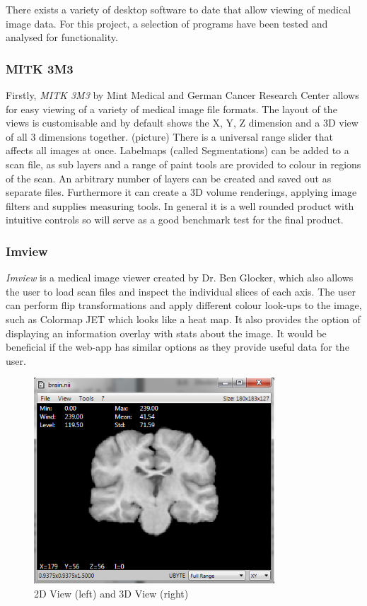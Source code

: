 \documentclass[a4paper,11pt,titlepage]{article}
\begin{document}
There exists a variety of desktop software to date that allow viewing of medical image data. For this project, a selection of programs have been tested and analysed for functionality.

\subsubsection{MITK 3M3}
Firstly, \textit{MITK 3M3} by Mint Medical and German Cancer Research Center allows for easy viewing of a variety of medical image file formats. The layout of the views is customisable and by default shows the X, Y, Z dimension and a 3D view of all 3 dimensions together. (picture) There is a universal range slider that affects all images at once. Labelmaps (called Segmentations) can be added to a scan file, as sub layers and a range of paint tools are provided to colour in regions of the scan. An arbitrary number of layers can be created and saved out as separate files. 
Furthermore it can create a 3D volume renderings, applying image filters and supplies measuring tools. In general it is a well rounded product with intuitive controls so will serve as a good benchmark test for the final product.

\subsubsection{Imview}
\textit{Imview} is a medical image viewer created by Dr. Ben Glocker, which also allows the user to load scan files and inspect the individual slices of each axis. The user can perform flip transformations and apply different colour look-ups to the image, such as Colormap JET which looks like a heat map. It also provides the option of displaying an information overlay with stats about the image. It would be beneficial if the web-app has similar options as they provide useful data for the user.


\begin{figure}[ht!]
\centering
\includegraphics[width=90mm]{..//literatureSurvey/graphics/imview_01.png}
\caption{2D View (left) and 3D View (right)}
\label{fig:UIdesign1}
\end{figure}
\end{document}
